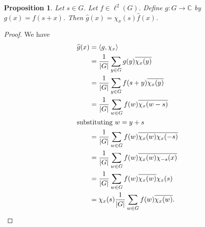 \documentclass[12pt]{article}
\newtheorem{Proposition}{Proposition}
\newcommand{\C}{\mathbb{C}}
\begin{document}
\begin{Proposition} %
    Let $s\in G$. Let  $f\in \ell^2(G)$. Define $g : G \to \C$ by $g(x) = f(s+x)$. Then $\widehat{g}(x) = \chi_x(s)\widehat{f}(x)$.
\end{Proposition}
\begin{proof}
    We have
    \begin{align*}
        \widehat{g}(x)
          & = \langle g, \chi_x \rangle                                                    \\
          & = \frac{1}{|G|} \sum_{y\in G} g(y) \overline{\chi_x(y)}                        \\
          & = \frac{1}{|G|}\sum_{y\in G}f(s+y)\overline{\chi_x(y)}                         \\
          & = \frac{1}{|G|} \sum_{w\in G} f(w) \overline{\chi_x(w-s)}                      \\
        \intertext{substituting $w = y+s$}
          & = \frac{1}{|G|} \sum_{w\in G} f(w) \overline{\chi_x(w)}\overline{\chi_x(-s)}   \\
          & = \frac{1}{|G|} \sum_{w\in G} f(w) \overline{\chi_x(w)}\overline{\chi_{-s}(x)} \\
          & = \frac{1}{|G|} \sum_{w\in G} f(w) \overline{\chi_x(w)} \chi_x(s)              \\
          & = \chi_x(s)\frac{1}{|G|} \sum_{w\in G} f(w) \overline{\chi_x(w)}.
    \end{align*}
\end{proof}
\end{document}
